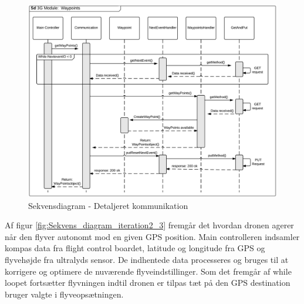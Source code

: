 \begin{figure}[H]
	\centering
	\includegraphics[width=1\textwidth]{Billeder/sekvens/sekvens_getwaypoints.png}
	\caption{Sekvensdiagram - Detaljeret kommunikation}
	\label{fig:Sekvens_getwaypoints}
\end{figure}

\newpage

Af figur \ref{fig:Sekvens_diagram_iteration2_3} fremgår det hvordan dronen agerer når den flyver autonomt mod en given GPS position. Main controlleren indsamler kompas data fra flight control boardet, latitude og longitude fra GPS og flyvehøjde fra ultralyds sensor. De indhentede data processeres og bruges til at korrigere og optimere de nuværende flyveindstillinger.
Som det fremgår af while loopet fortsætter flyvningen indtil dronen er tilpas tæt på den GPS destination bruger valgte i flyveopsætningen. 


